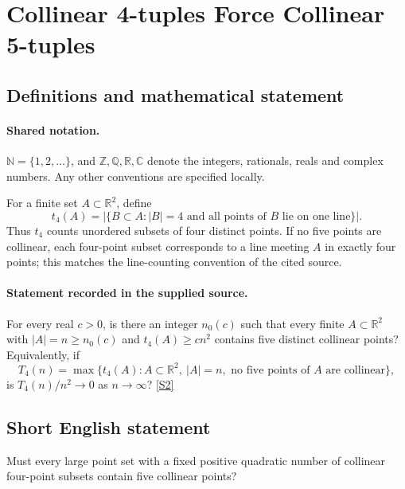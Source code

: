 \documentclass[11pt]{article}
\newcommand{\sref}[2]{\hyperlink{source:#1:#2}{[S#2]}}
\begin{document}
\section{Collinear 4-tuples Force Collinear 5-tuples}\label{statement}

\subsection{Definitions and mathematical statement}

\paragraph{Shared notation.}$\mathbb N=\{1,2,\ldots\}$, and $\mathbb Z,\mathbb Q,\mathbb R,\mathbb C$ denote the integers, rationals, reals and complex numbers. Any other conventions are specified locally.


For a finite set $A\subset\mathbb R^2$, define
\[
 t_4(A)=\bigl|\{B\subset A:|B|=4\text{ and all points of }B\text{ lie on one line}\}\bigr|.
\]
Thus $t_4$ counts unordered subsets of four distinct points. If no five points are collinear, each four-point subset corresponds to a line meeting $A$ in exactly four points; this matches the line-counting convention of the cited source.
\paragraph{Statement recorded in the supplied source.}
For every real $c>0$, is there an integer $n_0(c)$ such that every finite $A\subset\mathbb R^2$ with $|A|=n\geq n_0(c)$ and $t_4(A)\geq c n^2$ contains five distinct collinear points? Equivalently, if
\[
 T_4(n)=\max\{t_4(A):A\subset\mathbb R^2,\ |A|=n,\text{ no five points of }A\text{ are collinear}\},
\]
is $T_4(n)/n^2\longrightarrow0$ as $n\to\infty$? \sref{statement}{2}
\subsection{Short English statement}
Must every large point set with a fixed positive quadratic number of collinear four-point subsets contain five collinear points?
\end{document}
